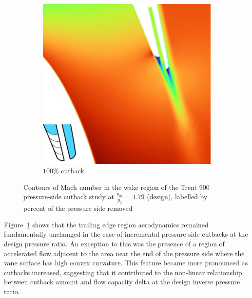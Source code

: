 \documentclass[a4paper, 11pt, oneside]{report}
\begin{document}
\begin{figure}[H]
\begin{subfigure}{.15\textwidth}
	\end{subfigure}
	\begin{subfigure}{.42\textwidth}
		\centering
		\includegraphics[width=\linewidth]{figs/ps_cutbacks_design_100.png}
		\caption{$100\%$ cutback}
	\end{subfigure}
	\caption{Contours of Mach number in the wake region of the Trent 900 pressure-side cutback study at $\frac{p_{01}}{p_2}=1.79$ (design), labelled by percent of the pressure side removed}
	\label{fig:ps_cutbacks_design}
\end{figure}

Figure~\ref{fig:ps_cutbacks_design} shows that the trailing edge region aerodynamics remained fundamentally unchanged in the case of incremental pressure-side cutbacks at the design pressure ratio. An exception to this was the presence of a region of accelerated flow adjacent to the area near the end of the pressure side where the vane surface has high convex curvature. This feature became more pronounced as cutbacks increased, suggesting that it contributed to the non-linear relationship between cutback amount and flow capacity delta at the design inverse pressure ratio. 
\end{document}
